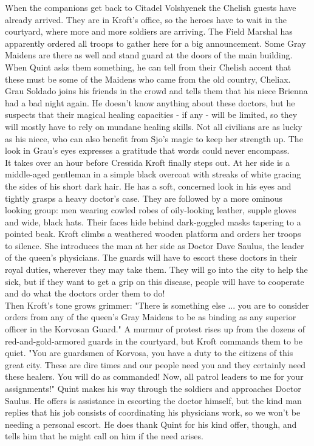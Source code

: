 When the companions get back to Citadel Volshyenek the Chelish guests have already arrived. They are in Kroft's office, so the heroes have to wait in the courtyard, where more and more soldiers are arriving. The Field Marshal has apparently ordered all troops to gather here for a big announcement. Some Gray Maidens are there as well and stand guard at the doors of the main building. When Quint asks them something, he can tell from their Chelish accent that these must be some of the Maidens who came from the old country, Cheliax. Grau Soldado joins his friends in the crowd and tells them  that his niece Brienna had a bad night again. He doesn't know anything about these doctors, but he suspects that their magical healing capacities - if any - will be limited, so they will mostly have to rely on mundane healing skills. Not all civilians are as lucky as his niece, who can also benefit from Sjo's magic to keep her strength up. The look in Grau's eyes expresses a gratitude that words could never encompass.\\

It takes over an hour before Cressida Kroft finally steps out. At her side is a middle-aged gentleman in a simple black overcoat with streaks of white gracing the sides of his short dark hair. He has a soft, concerned look in his eyes and tightly grasps a heavy doctor's case. They are followed by a more ominous looking group: men wearing cowled robes of oily-looking leather, supple gloves and wide, black hats. Their faces hide behind dark-goggled masks tapering to a pointed beak. Kroft climbs a weathered wooden platform and orders her troops to silence. She introduces the man at her side as Doctor Dave Saulus, the leader of the queen's physicians. The guards will have to escort these doctors in their royal duties, wherever they may take them. They will go into the city to help the sick, but if they want to get a grip on this disease, people will have to cooperate and do what the doctors order them to do!\\

Then Kroft's tone grows grimmer: "There is something else ... you are to consider orders from any of the queen's Gray Maidens to be as binding as any superior officer in the Korvosan Guard." A murmur of protest rises up from the dozens of red-and-gold-armored guards in the courtyard, but Kroft commands them to be quiet. "You are guardsmen of Korvosa, you have a duty to the citizens of this great city. These are dire times and our people need you and they certainly need these healers. You will do as commanded! Now, all patrol leaders to me for your assignments!" Quint makes his way through the soldiers and approaches Doctor Saulus. He offers is assistance in escorting the doctor himself, but the kind man replies that his job consists of coordinating his physicians work, so we won't be needing a personal escort. He does thank Quint for his kind offer, though, and tells him that he might call on him if the need arises.\\

